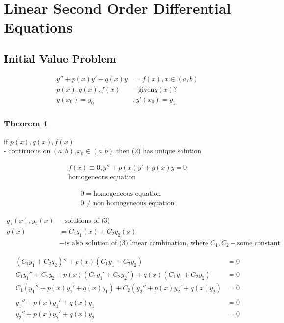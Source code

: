 \documentclass[10pt, letterpaper]{article}
\begin{document}
\section{Linear Second Order Differential Equations}
\subsection{Initial Value Problem}

\begin{align*}
y'' + p(x)y' + q(x)y &= f(x), x \in (a,b)\\
p(x), q(x), f(x) &- \text{given} y(x)?\\
y(x_0) = y_0&, y'(x_0) = y_1
\end{align*}

\subsubsection{Theorem 1}
if $p(x), q(x), f(x)$\\
- continuous on $(a,b), x_0 \in (a,b)$ then (2) has unique solution

\begin{align*}
f(x) \equiv 0, y'' + p(x)y' + g(x)y = 0\\
\text{homogeneous equation}
\end{align*}

\begin{align*}
0= \text{homogeneous equation}\\
0\neq \text{non homogeneous equation}
\end{align*}

\begin{align*}
y_1(x), y_2(x) &- \text{solutions of (3)}\\
y(x) &= C_1y_1(x) + C_2y_2(x)\\
&- \text{is also solution of (3) linear combination, where }C_1, C_2 - \text{some constant}
\end{align*}

\begin{align*}
(C_1y_1 + C_2y_2)'' + p(x)(C_1y_1 + C_2y_2) &= 0\\
C_1y_1'' + C_2y_2 + p(x)(C_1y_1' + C_2y_2') + q(x)(C_1y_1 + C_2y_2) &= 0\\
C_1(y_1'' + p(x)y_1' + q(x)y_1) + C_2(y_2'' + p(x)y_2' + q(x)y_2) &= 0\\
\\
y_1'' + p(x)y_1' + q(x)y_1 &= 0\\
y_2'' + p(x)y_2' + q(x)y_2 &= 0
\end{align*}
\end{document}
